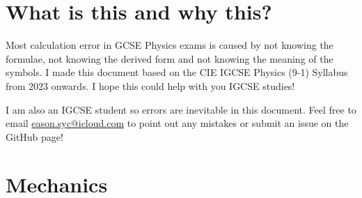 \documentclass[8pt]{article}
\author{\Author}
\title{\Title}
\date{Version 1. \Date}
\begin{document}
	\maketitle

	\tableofcontents

    \section*{What is this and why this?}
        Most calculation error in GCSE Physics exams is caused by not knowing the formulae, not knowing the derived form and not knowing the meaning of the symbols. I made this document based on the CIE IGCSE Physics (9-1) Syllabus from 2023 onwards. I hope this could help with you IGCSE studies!

        I am also an IGCSE student so errors are inevitable in this document. Feel free to email \href{eason.syc@icloud.com}{eason.syc@icloud.com} to point out any mistakes or submit an issue on the GitHub page!

    \section{Mechanics}
\end{document}
